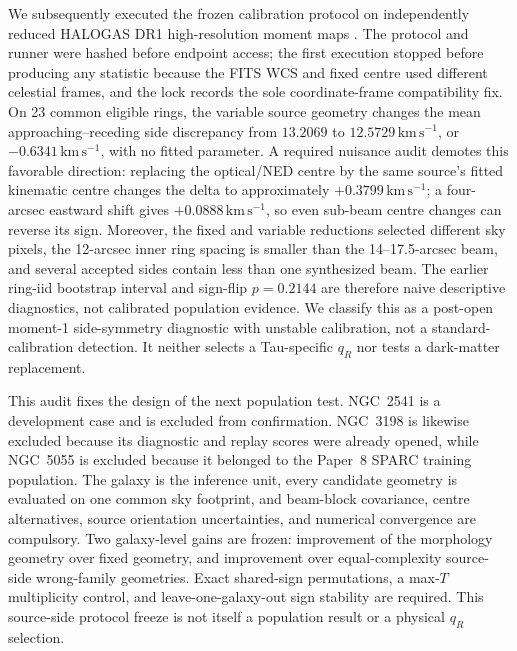 \documentclass[11pt]{article}
\begin{document}
We subsequently executed the frozen calibration protocol on independently
reduced HALOGAS DR1 high-resolution moment maps
\cite{Heald2011HALOGAS,Heald2019HALOGASDR1}. The protocol and runner were
hashed before endpoint access; the first execution stopped before producing
any statistic because the FITS WCS and fixed centre used different celestial
frames, and the lock records the sole coordinate-frame compatibility fix. On
23 common eligible rings, the variable source geometry changes the mean
approaching--receding side discrepancy from
$13.2069$ to $12.5729\,\mathrm{km\,s^{-1}}$, or
$-0.6341\,\mathrm{km\,s^{-1}}$, with no fitted parameter. A required nuisance
audit demotes this favorable direction: replacing the optical/NED centre by
the same source's fitted kinematic centre changes the delta to approximately
$+0.3799\,\mathrm{km\,s^{-1}}$; a four-arcsec eastward shift gives
$+0.0888\,\mathrm{km\,s^{-1}}$, so even sub-beam centre changes can reverse
its sign. Moreover, the fixed and variable reductions selected different sky
pixels, the 12-arcsec inner ring spacing is smaller than the
14--17.5-arcsec beam, and several accepted sides contain less than one
synthesized beam. The earlier ring-iid bootstrap interval and sign-flip
$p=0.2144$ are therefore naive descriptive diagnostics, not calibrated
population evidence. We classify this as a post-open moment-1 side-symmetry
diagnostic with unstable calibration, not a standard-calibration detection.
It neither selects a Tau-specific $q_R$ nor tests a dark-matter replacement.

This audit fixes the design of the next population test. NGC~2541 is a
development case and is excluded from confirmation. NGC~3198 is likewise
excluded because its diagnostic and replay scores were already opened, while
NGC~5055 is excluded because it belonged to the Paper~8 SPARC training
population. The galaxy is the
inference unit, every candidate geometry is evaluated on one common sky
footprint, and beam-block covariance, centre alternatives, source orientation
uncertainties, and numerical convergence are compulsory. Two galaxy-level
gains are frozen: improvement of the morphology geometry over fixed geometry,
and improvement over equal-complexity source-side wrong-family geometries.
Exact shared-sign permutations, a max-$T$ multiplicity control, and
leave-one-galaxy-out sign stability are required. This source-side protocol
freeze is not itself a population result or a physical $q_R$ selection.
\end{document}
